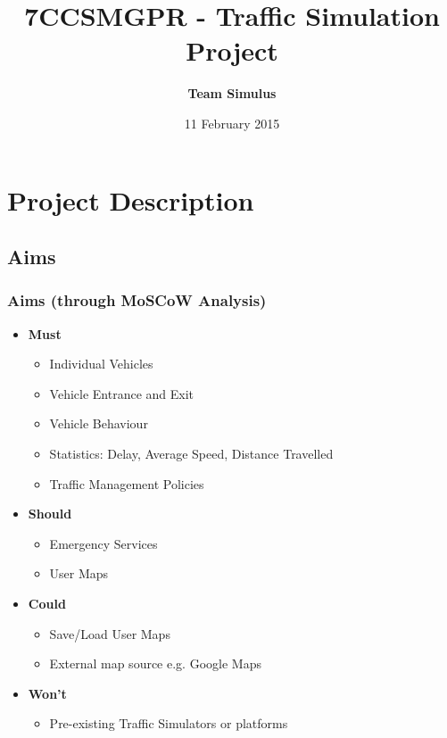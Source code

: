 \documentclass{beamer}
\title[Welcome]{7CCSMGPR - Traffic Simulation Project} %
\author{\textbf{Team Simulus}} %
\institute[KCL] %
{
King's College London \\ %
\medskip
\textit{https://github.com/leorohr/simulus} %
}
\date{11 February 2015} %
\begin{document}
\begin{frame}
\titlepage %
\end{frame}



\section{Project Description} %

\subsection{Aims} %

\begin{frame}
\frametitle{Aims (through MoSCoW Analysis)}

\begin{itemize}
\item \textbf{Must}
	\begin{itemize}
		\item Individual Vehicles
		\item Vehicle Entrance and Exit 
		\item Vehicle Behaviour
		\item Statistics: Delay, Average Speed, Distance Travelled
		\item Traffic Management Policies
	\end{itemize}
\item \textbf{Should}
	\begin{itemize}
		\item Emergency Services
		\item User Maps
	\end{itemize}
\item \textbf{Could}
	\begin{itemize}
		\item Save/Load User Maps
		\item External map source e.g. Google Maps
		\end{itemize}
\item \textbf{Won't}
	\begin{itemize}
		\item Pre-existing Traffic Simulators or platforms	
	\end{itemize}	
\end{itemize}

\end{frame}
\end{document}
